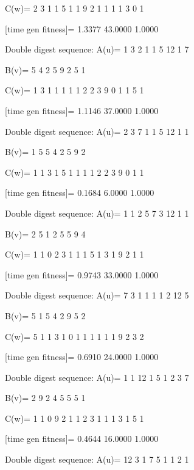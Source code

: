 C(w)=
     2     3     1     1     5     1     1     9     2     1     1     1     1     3     0     1

[time gen fitness]=
    1.3377   43.0000    1.0000

Double digest sequence:
A(u)=
     1     3     2     1     1     5    12     1     7

B(v)=
     5     4     2     5     9     2     5     1

C(w)=
     1     3     1     1     1     1     1     2     2     3     9     0     1     1     5     1

[time gen fitness]=
    1.1146   37.0000    1.0000

Double digest sequence:
A(u)=
     2     3     7     1     1     5    12     1     1

B(v)=
     1     5     5     4     2     5     9     2

C(w)=
     1     1     3     1     5     1     1     1     1     2     2     3     9     0     1     1

[time gen fitness]=
    0.1684    6.0000    1.0000

Double digest sequence:
A(u)=
     1     1     2     5     7     3    12     1     1

B(v)=
     2     5     1     2     5     5     9     4

C(w)=
     1     1     0     2     3     1     1     1     5     1     3     1     9     2     1     1

[time gen fitness]=
    0.9743   33.0000    1.0000

Double digest sequence:
A(u)=
     7     3     1     1     1     1     2    12     5

B(v)=
     5     1     5     4     2     9     5     2

C(w)=
     5     1     1     3     1     0     1     1     1     1     1     1     9     2     3     2

[time gen fitness]=
    0.6910   24.0000    1.0000

Double digest sequence:
A(u)=
     1     1    12     1     5     1     2     3     7

B(v)=
     2     9     2     4     5     5     5     1

C(w)=
     1     1     0     9     2     1     1     2     3     1     1     1     3     1     5     1

[time gen fitness]=
    0.4644   16.0000    1.0000

Double digest sequence:
A(u)=
    12     3     1     7     5     1     1     2     1

